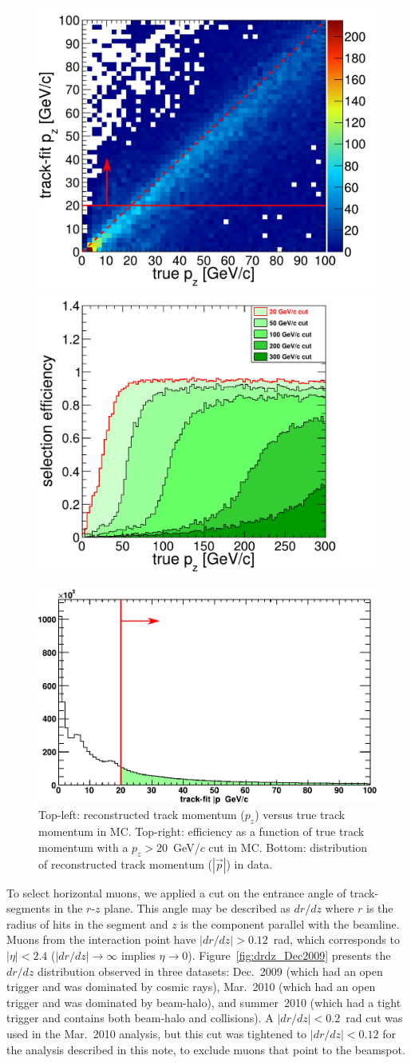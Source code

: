 \documentclass[12pt]{article}
\begin{document}
\begin{figure}
\begin{center}
\includegraphics[height=6 cm]{trackfit_resolution.pdf}\hfill
\includegraphics[height=6 cm]{trackfit_turnon.pdf}

\includegraphics[height=5 cm]{momentum_Oct2010.pdf}
\end{center}
\caption{Top-left: reconstructed track momentum ($p_z$) versus true
  track momentum in MC.  Top-right: efficiency as a function of true
  track momentum with a $p_z > 20$~GeV/$c$ cut in MC.  Bottom:
  distribution of reconstructed track momentum ($|\vec{p}|$) in
  data. \label{fig:trackfit_resolution}}
\end{figure}

To select horizontal muons, we applied a cut on the entrance angle of
track-segments in the $r$-$z$ plane.  This angle may be described as
$dr/dz$ where $r$ is the radius of hits in the segment and $z$ is the
component parallel with the beamline.  Muons from the interaction
point have $|dr/dz| > 0.12$~rad, which corresponds to $|\eta| < 2.4$
($|dr/dz| \to \infty$ implies $\eta \to 0$).
Figure~\ref{fig:drdz_Dec2009} presents the $dr/dz$ distribution
observed in three datasets: Dec.~2009 (which had an open trigger and
was dominated by cosmic rays), Mar.~2010 (which had an open trigger
and was dominated by beam-halo), and summer~2010 (which had a tight
trigger and contains both beam-halo and collisions).  A $|dr/dz| <
0.2$~rad cut was used in the Mar.~2010 analysis, but this cut was
tightened to $|dr/dz| < 0.12$ for the analysis described in this note,
to exclude muons that point to the beamspot.
\end{document}
